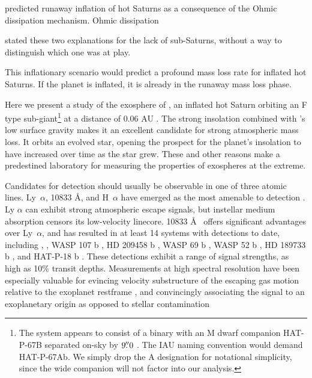 \documentclass[twocolumn]{aastex631}
\begin{document}
\citet{2011ApJ...738....1B} predicted runaway inflation of hot Saturns as a consequence of the Ohmic dissipation mechanism.  Ohmic dissipation


\citet{2018AJ....155..214T} stated these two explanations for the lack of sub-Saturns, without a way to distinguish which one was at play.


This inflationary scenario would predict a profound mass loss rate for inflated hot Saturns.  If the planet is inflated, it is already in the runaway mass loss phase.


Here we present a study of the exosphere of , an inflated hot Saturn orbiting an F type sub-giant\footnote{The system appears to consist of a binary with an M dwarf companion HAT-P-67B separated on-sky by $9\mbox{$.\!\!^{\prime\prime}$}0$ \citep{2019MNRAS.490.5088M}.  The IAU naming convention would demand HAT-P-67Ab.  We simply drop the A designation for notational simplicity, since the wide companion will not factor into our analysis.} at a distance of 0.06 AU \citep{2017AJ....153..211Z}.  The strong insolation combined with 's low surface gravity makes it an excellent candidate for strong atmospheric mass loss.  It orbits an evolved star, opening the prospect for the planet's insolation to have increased over time as the star grew.  These and other reasons make  a predestined laboratory for measuring the properties of exospheres at the extreme.


Candidates for detection should usually be observable in one of three atomic lines.  Ly~$\alpha$,  10833 \AA, and H~$\alpha$ have emerged as the most amenable to detection \citep{2018ApJ...855L..11O,2023MNRAS.518.4357O}.  Ly $\alpha$ can exhibit strong atmospheric escape signals, but instellar medium  absorption censors its low-velocity linecore.   10833 \AA~ offers significant advantages over Ly~$\alpha$, and has resulted in at least 14 systems with detections to date, including  \citep{2020ApJ...894...97N, 2021A&A...647A.129L},  \citep{2022AJ....163...68Z}, WASP 107 b \citep{2019A&A...623A..58A,2020AJ....159..115K}, HD 209458 b \citep{2019A&A...629A.110A}, WASP 69 b \citep{2020AJ....159..278V}, WASP 52 b \citep{2020AJ....159..278V}, HD 189733 b \citep{2021A&A...647A.129L}, and HAT-P-18 b \citep{2021ApJ...909L..10P}.  These detections exhibit a range of signal strengths, as high as 10$\%$ transit depths.  Measurements at high spectral resolution have been especially valuable for evincing velocity substructure of the escaping gas motion relative to the exoplanet restframe \citep{2019A&A...629A.110A,2020ApJ...894...97N}, and convincingly associating the signal to an exoplanetary origin as opposed to stellar contamination \citep{2018AJ....156..189C}
\end{document}
